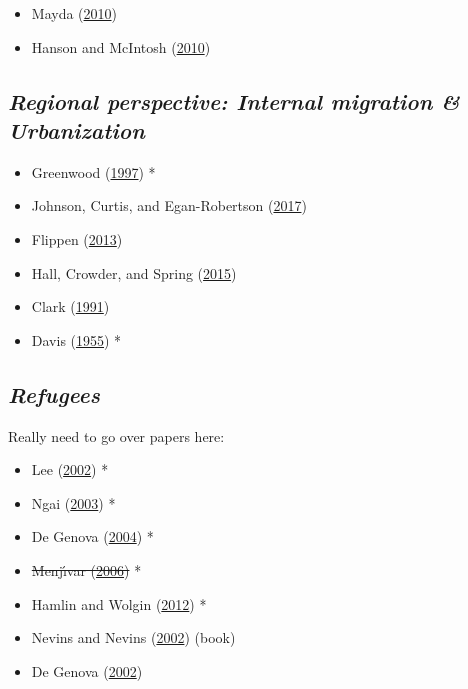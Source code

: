 \documentclass[
]{article}
\providecommand{\tightlist}{%
  \setlength{\itemsep}{0pt}\setlength{\parskip}{0pt}}
\begin{document}
\begin{itemize}
\tightlist
\item
  Mayda (\protect\hyperlink{ref-mayda2010international}{2010})
\item
  Hanson and McIntosh (\protect\hyperlink{ref-hanson2010great}{2010})
\end{itemize}

\hypertarget{regional-perspective-internal-migration-urbanization}{%
\subsection{\texorpdfstring{\emph{Regional perspective: Internal
migration \&
Urbanization}}{Regional perspective: Internal migration \& Urbanization}}\label{regional-perspective-internal-migration-urbanization}}

\begin{itemize}
\tightlist
\item
  Greenwood (\protect\hyperlink{ref-greenwood1997internal}{1997}) *
\item
  Johnson, Curtis, and Egan-Robertson
  (\protect\hyperlink{ref-johnson2017frozen}{2017})
\item
  Flippen (\protect\hyperlink{ref-flippen2013relative}{2013})
\item
  Hall, Crowder, and Spring
  (\protect\hyperlink{ref-hall2015neighborhood}{2015})
\item
  Clark (\protect\hyperlink{ref-clark1991residential}{1991})
\item
  Davis (\protect\hyperlink{ref-davis1955origin}{1955}) *
\end{itemize}

\hypertarget{refugees}{%
\subsection{\texorpdfstring{\emph{Refugees}}{Refugees}}\label{refugees}}

Really need to go over papers here:

\begin{itemize}
\tightlist
\item
  Lee (\protect\hyperlink{ref-lee2002enforcing}{2002}) *
\item
  Ngai (\protect\hyperlink{ref-ngai2003strange}{2003}) *
\item
  De Genova (\protect\hyperlink{ref-de2004legal}{2004}) *
\item
  \sout{Menjı́var (\protect\hyperlink{ref-menjivar2006liminal}{2006})} *
\item
  Hamlin and Wolgin (\protect\hyperlink{ref-hamlin2012symbolic}{2012}) *
\item
  Nevins and Nevins (\protect\hyperlink{ref-nevins2002operation}{2002})
  (book)
\item
  De Genova (\protect\hyperlink{ref-de2002migrant}{2002})
\end{itemize}
\end{document}
